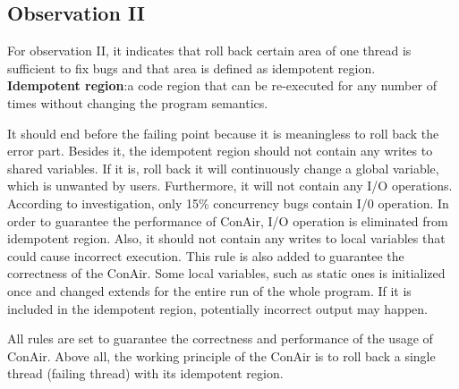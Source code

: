 \subsection{Observation II}
\label{sbii}
For observation II, it indicates that roll back certain area of one thread is
sufficient to fix bugs and that area is defined as idempotent region.\\

\textbf{Idempotent region}:a code region that can be re-executed for any number of times without changing the program semantics.


It should end before the failing point because it is meaningless to roll back
the error part. Besides it, the idempotent region should not contain any writes
to shared variables. If it is, roll back it will continuously change a global
variable, which is unwanted by users. Furthermore, it will not contain any I/O
operations. According to investigation, only 15\% concurrency bugs contain I/0
operation. In order to guarantee the performance of ConAir, I/O operation is
eliminated from idempotent region. Also, it should not contain any writes to
local variables that could cause incorrect execution. This rule is also added to
guarantee the correctness of the ConAir. Some local variables, such as static
ones is initialized once and changed extends for the entire run of the whole
program. If it is included in the idempotent region, potentially incorrect
output may happen.

All rules are set to guarantee the correctness and performance of the usage of
ConAir. Above all, the working principle of the ConAir is to roll back a single
thread (failing thread) with its idempotent region.
